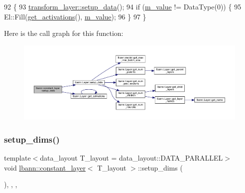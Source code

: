 \begin{DoxyCode}
92                              \{
93     \hyperlink{classlbann_1_1Layer_a50a89f8a68762c677d48efe384676e81}{transform\_layer::setup\_data}();
94     \textcolor{keywordflow}{if} (\hyperlink{classlbann_1_1constant__layer_a8cdb9c854777cc29f1cf1f60da64ef4e}{m\_value} != DataType(0)) \{
95       El::Fill(\hyperlink{classlbann_1_1Layer_a1134b1a4385af199d7272c5aa827fa99}{get\_activations}(), \hyperlink{classlbann_1_1constant__layer_a8cdb9c854777cc29f1cf1f60da64ef4e}{m\_value});
96     \}
97   \}
\end{DoxyCode}
Here is the call graph for this function\+:\nopagebreak
\begin{figure}[H]
\begin{center}
\leavevmode
\includegraphics[width=350pt]{classlbann_1_1constant__layer_ad46d9db2e6bad4204dcedd2be60bfb1a_cgraph}
\end{center}
\end{figure}
\mbox{\label{classlbann_1_1constant__layer_a147f3510683632f90bd1491f80d8ef32}} 
\subsubsection{\texorpdfstring{setup\+\_\+dims()}{setup\_dims()}}
{\footnotesize\ttfamily template$<$data\+\_\+layout T\+\_\+layout = data\+\_\+layout\+::\+D\+A\+T\+A\+\_\+\+P\+A\+R\+A\+L\+L\+EL$>$ \\
void \hyperlink{classlbann_1_1constant__layer}{lbann\+::constant\+\_\+layer}$<$ T\+\_\+layout $>$\+::setup\+\_\+dims (\begin{DoxyParamCaption}{ }\end{DoxyParamCaption})\hspace{0.3cm}{\ttfamily [inline]}, {\ttfamily [override]}, {\ttfamily [protected]}, {\ttfamily [virtual]}}

